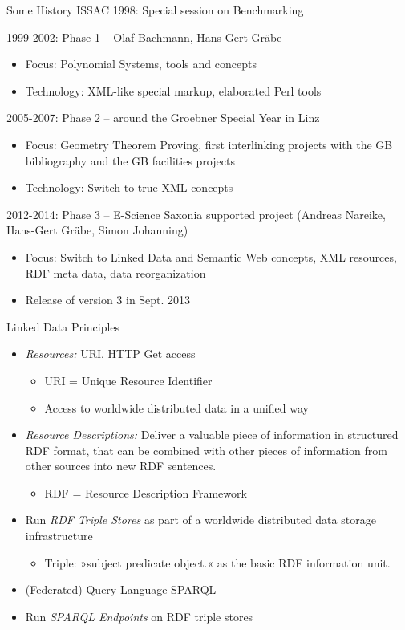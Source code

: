 \documentclass{beamer}
\begin{document}
\begin{frame}{Some History}{}
ISSAC 1998: Special session on Benchmarking 

1999-2002: Phase 1 -- Olaf Bachmann, Hans-Gert Gr\"abe
\begin{itemize}
\item Focus: Polynomial Systems, tools and concepts
\item Technology: XML-like special markup, elaborated Perl tools
\end{itemize}
2005-2007: Phase 2 -- around the Groebner Special Year in Linz
\begin{itemize}
\item Focus: Geometry Theorem Proving, first interlinking projects with the GB
  bibliography and the GB facilities projects
\item Technology: Switch to true XML concepts
\end{itemize}
2012-2014: Phase 3 -- E-Science Saxonia supported project (Andreas Nareike,
Hans-Gert Gr\"abe, Simon Johanning)
\begin{itemize}
\item Focus: Switch to Linked Data and Semantic Web concepts, XML resources,
  RDF meta data, data reorganization
\item Release of version 3 in Sept. 2013
\end{itemize}
\end{frame}

\begin{frame}{Linked Data Principles}{}
\begin{itemize}
\item \emph{Resources:} URI, HTTP Get access
\begin{itemize}
\item URI = Unique Resource Identifier
\item Access to worldwide distributed data in a unified way
\end{itemize}
\item \emph{Resource Descriptions:} Deliver a valuable piece of information in
  structured RDF format, that can be combined with other pieces of information
  from other sources into new RDF sentences.
\begin{itemize}
\item RDF = Resource Description Framework
\end{itemize}
\item Run \emph{RDF Triple Stores} as part of a worldwide distributed data
  storage infrastructure
\begin{itemize}
\item Triple: »subject predicate object.« as the basic RDF information unit.
\end{itemize}
\item (Federated) Query Language SPARQL
\item Run \emph{SPARQL Endpoints} on RDF triple stores
\end{itemize}
\end{frame}
\end{document}
